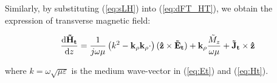\documentclass[11pt]{article}
\newcommand{\v}[1]{\mathbf{#1}} %
\newcommand{\t}[1]{\tilde{#1}} %
\renewcommand{\w}{\omega}  %
\renewcommand{\e}{\varepsilon}  %
\renewcommand{\u}{\mu}  %
\renewcommand{\p}{\rho}  %
\begin{document}
  Similarly, by substituting (\ref{eq:sLH}) into (\ref{eq:dFT_HT}), we obtain the expression of transverse magnetic field:

  \begin{equation}
    \dv{\v{\t{H}_t}}{z} =
    \frac{1}{j \w \u} \left( k^2 - \v{k_{\p}}\v{k_{\p}} \cdot \right) (\v{\hat{z}} \times \v{\t{E}_t}) + \v{k_{\p}} \frac{\t{M}_z}{\w \u} + \v{\t{J}_t}
    \times \v{\hat{z}}
    \label{eq:Ht}
  \end{equation}

  where $k = \w \sqrt{\u \e}$ is the medium wave-vector in (\ref{eq:Et}) and (\ref{eq:Ht}).





  
  
\end{document}
